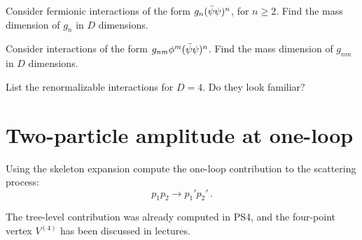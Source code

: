 \documentclass{tutorial}
\begin{document}
Consider fermionic interactions of the form $g_n (\bar{\psi}\psi)^n$,
for $n \geq 2$. Find the mass dimension of $g_n$ in $D$ dimensions.

Consider interactions of the form $g_{nm} \phi^m
  (\bar{\psi}\psi)^n$. Find the mass dimension of $g_{nm}$ in $D$
dimensions.

List the renormalizable interactions for $D=4$. Do they look
familiar?

\section{ Two-particle amplitude at one-loop}

Using the skeleton expansion compute the one-loop contribution to
the scattering process:
\[
  p_1 p_2 \rightarrow p_1' p_2'\, .
\]

The tree-level contribution was already computed in PS4, and the
four-point vertex $V^{(4)}$ has been discussed in lectures.
\end{document}
